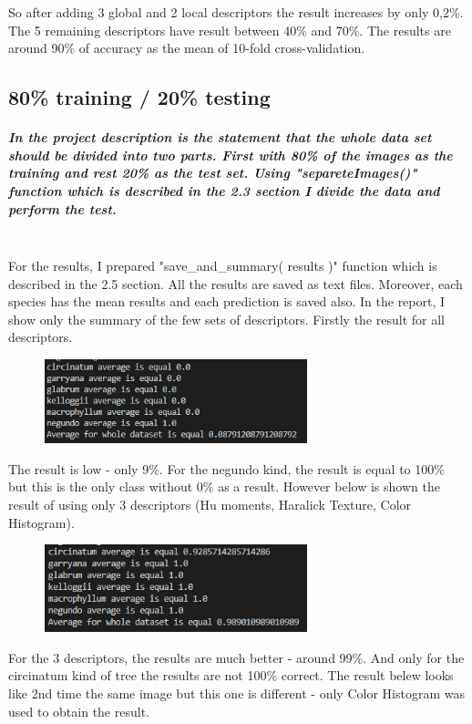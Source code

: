 \documentclass[12pt]{article}
\begin{document}
So after adding 3 global and 2 local descriptors the result increases by only 0,2\%. The 5 remaining descriptors have result between 40\% and 70\%. The results are around 90\% of accuracy as the mean of 10-fold cross-validation.

\subsection{80\% training / 20\% testing}

\subparagraph{
In the project description is the statement that the whole data set should be divided into two parts. First with 80\% of the images as the training and rest 20\% as the test set. Using "separeteImages()" function which is described in the 2.3 section I divide the data and perform the test.\\\\
}

For the results, I prepared "save\_and\_summary( results )" function which is described in the 2.5 section. All the results are saved as text files. Moreover, each species has the mean results and each prediction is saved also. In the report, I show only the summary of the few sets of descriptors. Firstly the result for all descriptors.

\begin{figure}[h!]
\centering
\includegraphics[width=3in]{results_1.png}
\end{figure}

The result is low - only 9\%. For the negundo kind, the result is equal to 100\% but this is the only class without 0\% as a result. However below is shown the result of using only 3 descriptors (Hu moments, Haralick Texture, Color Histogram).

\begin{figure}[h!]
\centering
\includegraphics[width=3in]{results_3.png}
\end{figure}
For the 3 descriptors, the results are much better - around 99\%. And only for the circinatum kind of tree the results are not 100\% correct. The result belew looks like 2nd time the same image but this one is different - only Color Histogram was used to obtain the result.
\end{document}
